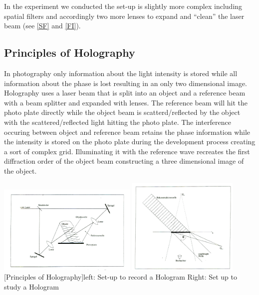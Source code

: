  

In the experiment we conducted the set-up is slightly more complex including spatial filters and accordingly two more lenses to expand and ``clean'' the laser beam (see \ref{SF} and \ref{FI}). 
\subsection{Principles of Holography}

In photography only information about the light intensity is stored while all information about the phase is lost resulting in an only two dimensional image. Holography uses a laser beam that is split into an object and a reference beam with a beam splitter and expanded with lenses. 
The reference beam will hit the photo plate directly while the object beam is scatterd/reflected by the object with the scattered/reflected light hitting the photo plate. The interference occuring between object and reference beam retains the phase information while the intensity is stored on the photo plate during the development process creating a sort of complex grid. Illuminating it with the reference wave recreates the first diffraction order of the object beam constructing a three dimensional image of the object.

\begin{minipage}{\textwidth}
	\centering
	\includegraphics[width=0.5\textwidth]{../figures/holo1}
	\includegraphics[width=0.4\textwidth]{../figures/holo2}
	[Principles of Holography]{left: Set-up to record a Hologram Right: Set up to study a Hologram }
\end{minipage}\vskip 0.5cm



